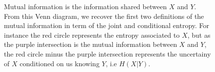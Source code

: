 \begin{figure}
\centering

    \caption{Mutual information is the information shared between $X$ and $Y$. From this Venn diagram, we recover the first two definitions of the mutual information in term of the joint and conditional entropy. For instance the red circle represents the entropy associated to $X$, but as the purple intersection is the mutual information between $X$ and $Y$, the red circle minus the purple intersection represents the uncertainy of $X$ conditioned on us knowing $Y$, i.e $H(X|Y)$.}
    \label{fig:mutual_info}
\end{figure}

























